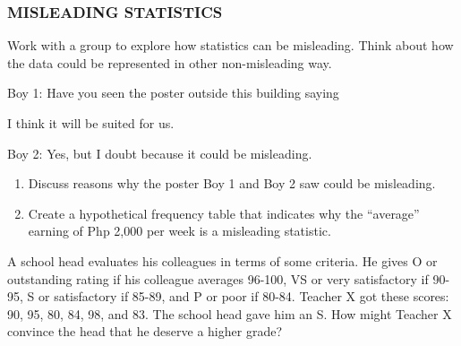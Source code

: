 \subsubsection*{MISLEADING STATISTICS}
Work with a group to explore how statistics can be misleading. Think about how the
data could be represented in other non-misleading way.
\begin{myenumerate}
\item Boy 1: Have you seen the poster outside this building saying

\begin{center}
\end{center}

I think it will be suited for us.

Boy 2: Yes, but I doubt because it could be misleading.

\begin{enumerate}
\item Discuss reasons why the poster Boy 1 and Boy 2 saw could be misleading.
\item Create a hypothetical frequency table that indicates why the “average” earning of
Php 2,000 per week is a misleading statistic.
\end{enumerate}

\item A school head evaluates his colleagues in terms of some criteria. He gives O or
outstanding rating if his colleague averages 96-100, VS or very satisfactory if 90-95, S or
satisfactory if 85-89, and P or poor if 80-84. Teacher X got these scores: 90, 95, 80, 84,
98, and 83. The school head gave him an S. How might Teacher X convince the head
that he deserve a higher grade?


\end{myenumerate}
